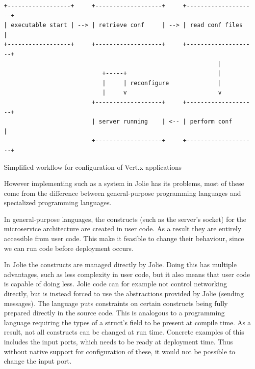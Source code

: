 \begin{listing}[H]
\begin{verbatim}
+------------------+     +-------------------+     +--------------------+
| executable start | --> | retrieve conf     | --> | read conf files    |
+------------------+     +-------------------+     +--------------------+
                                                             |
                            +-----+                          |
                            |     | reconfigure              |
                            |     v                          v
                         +-------------------+     +--------------------+
                         | server running    | <-- | perform conf       |
                         +-------------------+     +--------------------+
\end{verbatim}
\caption{Simplified workflow for configuration of Vert.x applications}
\label{fig:normal_conf}
\end{listing}


However implementing such as a system in Jolie has its problems, most of these
come from the difference between general-purpose programming languages and
specialized programming languages.

In general-purpose languages, the constructs (such as the server's socket) for
the microservice architecture are created in user code. As a result they are
entirely accessible from user code. This make it feasible to change their
behaviour, since we can run code before deployment occurs.


In Jolie the constructs are managed directly by Jolie. Doing this has multiple
advantages, such as less complexity in user code, but it also means that user
code is capable of doing less. Jolie code can for example not control
networking directly, but is instead forced to use the abstractions provided by
Jolie (sending messages). The language puts constraints on certain
constructs being fully prepared directly in the source code. This is analogous
to a programming language requiring the types of a struct's field to be present
at compile time. As a result, not all constructs can be changed at run time.
Concrete examples of this includes the input ports, which needs to be ready at
deployment time. Thus without native support for configuration of these, it
would not be possible to change the input port.

